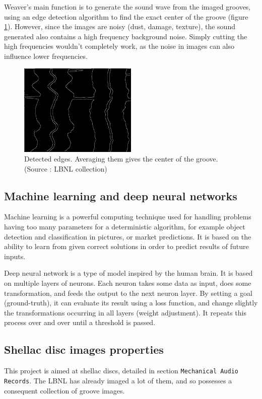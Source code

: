 \documentclass[12pt, twoside]{article}
\begin{document}
Weaver's main function is to generate the sound wave from the imaged grooves, using an edge detection algorithm to find the exact center of the groove (figure \ref{edges}). However, since the images are noisy (dust, damage, texture), the sound generated also contains a high frequency background noise. Simply cutting the high frequencies wouldn't completely work, as the noise in images can also influence lower frequencies.

\begin{figure}[H]
	\centering
	\includegraphics[width=0.5\textwidth]{../images/edges.png}
	\caption{Detected edges. Averaging them gives the center of the groove. (Source : LBNL collection)}
	\label{edges}
\end{figure}
\subsection{Machine learning and deep neural networks}
Machine learning is a powerful computing technique used for handling problems having too many parameters for a deterministic algorithm, for example object detection and classification in pictures, or market predictions. It is based on the ability to learn from given correct solutions in order to predict results of future inputs.

Deep neural network is a type of model inspired by the human brain. It is based on multiple layers of neurons. Each neuron takes some data as input, does some transformation, and feeds the output to the next neuron layer. By setting a goal (ground-truth), it can evaluate its result using a loss function, and change slightly the transformations occurring in all layers (weight adjustment). It repeats this process over and over until a threshold is passed.
\subsection{Shellac disc images properties}
This project is aimed at shellac discs, detailed in section \texttt{Mechanical Audio Records}. The LBNL has already imaged a lot of them, and so possesses a consequent collection of groove images.
\end{document}
